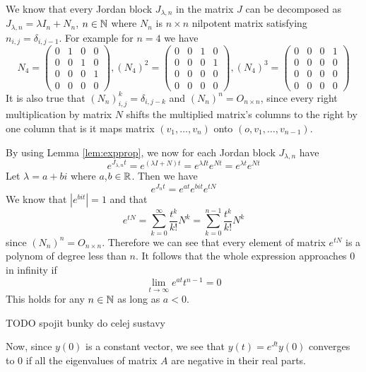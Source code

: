We know that every Jordan block $J_{\lambda,n}$ in the matrix $J$ can be decomposed as $J_{\lambda,n}=\lambda I_n+N_n$, $n \in\mathbb{N}$ where $N_n$ is $n \times n$ nilpotent matrix satisfying $n_{i,j}=\delta_{i,j-1}$. For example for $n=4$ we have
\begin{equation*}
	N_4=
	\begin{pmatrix}
		0 & 1 & 0 & 0 \\
		0 & 0 & 1 & 0 \\
		0 & 0 & 0 & 1 \\
		0 & 0 & 0 & 0 
	\end{pmatrix},
	(N_4)^2=
	\begin{pmatrix}
		0 & 0 & 1 & 0 \\
		0 & 0 & 0 & 1 \\
		0 & 0 & 0 & 0 \\
		0 & 0 & 0 & 0 
	\end{pmatrix},
	(N_4)^3=
	\begin{pmatrix}
		0 & 0 & 0 & 1 \\
		0 & 0 & 0 & 0 \\
		0 & 0 & 0 & 0 \\
		0 & 0 & 0 & 0 
	\end{pmatrix}
\end{equation*}
It is also true that $(N_n)^k_{i,j}=\delta_{i,j-k}$ and $(N_n)^n=O_{n \times n}$, since every right multiplication by matrix $N$ shifts the multiplied matrix's columns to the right by one column that is it maps matrix $(v_1,\ldots,v_n)$ onto $(o,v_1,\ldots,v_{n-1})$. 

By using Lemma \ref{lem:expprop}, we now for each Jordan block $J_{\lambda,n}$ have $$e^{J_{\lambda,n}t}=e^{(\lambda I + N)t}=e^{\lambda It}e^{Nt}=e^{\lambda t}e^{Nt}$$ Let $\lambda = a+bi$ where $a$,$b \in \mathbb{R}$. Then we have $$e^{J_nt}=e^{at}e^{bit}e^{tN}$$ We know that $|e^{bit}|=1$ and that $$e^{tN}=\sum^\infty_{k=0}\frac{t^k}{k!}N^k=\sum^{n-1}_{k=0}\frac{t^k}{k!}N^k$$ since $(N_n)^n=O_{n \times n}$. Therefore we can see that every element of matrix $e^{tN}$ is a polynom of degree less than $n$. It follows that the whole expression approaches 0 in infinity if $$\lim_{t\to\infty}e^{at}t^{n-1}=0$$ This holds for any $n\in\mathbb{N}$ as long as $a<0$. 

TODO spojit bunky do celej sustavy

Now, since $y(0)$ is a constant vector, we see that $y(t)=e^{Jt}y(0)$ converges to 0 if all the eigenvalues of matrix $A$ are negative in their real parts.

